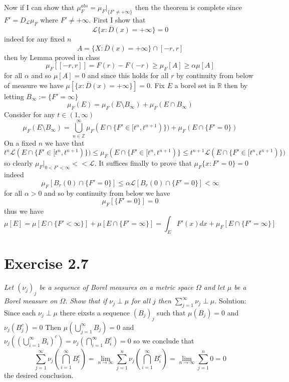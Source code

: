 \documentclass[11pt]{article}
\newcommand{\solution}[1]{{{\textcolor{header}{Solution:} \textcolor{solution}{#1}}}}
\begin{document}
{\[    \] 
    Now if I can show that $\mu_F^{abs} = \mu_F|_{\{F' \ne +\infty\}}$ then the theorem is complete since $F' = D_{\mathcal{L}}\mu_F$ where $F' \ne +\infty$.
    First I show that
    \[
        \mathcal{L}\{x : \overline{D}(x) = +\infty\} = 0
    \] 
    indeed for any fixed $n$
    \[
        A = \{X : \overline{D}(x) = +\infty\} \cap [-r,r]
    \] 
    then by Lemma proved in class
    \[
        \mu_F[[-r,r]] = F(r) - F(-r) \ge \mu_F[A] \ge \alpha \mu[A]
    \] 
    for all $\alpha$ and so $\mu[A] = 0$ and since this holds for all $r$ by continuity from below of measure we have  $\mu[\{x: \overline{D}(x) = +\infty\}] = 0$.
    Fix $E$ a borel set in $ \mathbb{R}$ then by letting $B_\infty := \{F' = \infty\}$
    \[
    \mu_F(E) = \mu_F(E \setminus B_\infty) + \mu_F(E \cap B_\infty)
    \] 
    Consider for any $t \in (1,\infty)$
    \[
        \mu_F(E \setminus B_\infty) = \bigcup_{n \in \mathbb{Z}}^{\infty} \mu_F(E \cap \{F' \in [t^{n},t^{n+1})\}) + \mu_F(E \cap \{F' = 0\})
    \] 
    On a fixed $n$ we have that
    \[
        t^{n} \mathcal{L}(E \cap \{F' \in [t^{n}, t^{n+1})\}) \le \mu_F(E \cap \{F' \in [t^{n}, t^{n+1})\} \le t^{n+1} \mathcal{L}(E \cap \{F' \in [t^{n},t^{n+1})\})
    \] 
    so clearly $\mu_F|_{0 < F' < \infty} << \mathcal{L}$. It suffices finally to prove that $\mu_F\{x : F' = 0\} = 0$ indeed
    \[
        \mu_F[B_r(0) \cap \{F' = 0\}] \le \alpha \mathcal{L}[B_r(0) \cap \{F' = 0\}] < \infty
    \] 
    for all $\alpha > 0$ and so by continuity from below we have
    \[
        \mu_F[\{F' = 0\}] = 0
    \] 
    thus we have
    \[
        \mu[E] = \mu[E \cap \{F' < \infty\}] + \mu[E \cap \{F' = \infty\}] = \int_{E}^{} F'(x) dx + \mu_F[E \cap \{F' = \infty\}]
    \] 
}

\section{Exercise 2.7}
\emph{
    Let $(\nu_j)_j$ be a sequence of Borel measures on a metric space  $\Omega$ and let  $\mu$ be a Borel measure on $\Omega$. Show that if
     $\nu_j \perp \mu$ for all $j$ then $\sum_{j=1}^{\infty}\nu_j \perp \mu$.
}
\solution{
    Since each $\nu_j \perp \mu$ there eixsts a sequence $(B_j)_j$ such that  $\mu(B_j) = 0$ and $\nu_j(B_j^{c}) = 0$ Then $\mu(\bigcup_{j=1}^{\infty}B_j) = 0$
    and $\nu_j((\bigcup_{i=1}^{\infty}B_i)^{c}) = \nu_j(\bigcap_{i=1}^{\infty}B_i^{c}) = 0$ so we conclude that
    \[
        \sum_{j=1}^{\infty}\nu_j(\bigcap_{i=1}^{\infty}B_i^{c}) = \lim_{n\to \infty}\sum_{j=1}^{n}\nu_j(\bigcap_{i=1}^{\infty}B_i^{c}) = \lim_{n\to \infty}\sum_{j=1}^{n}0 = 0
    \] 
    the desired conclusion.
}
\end{document}
